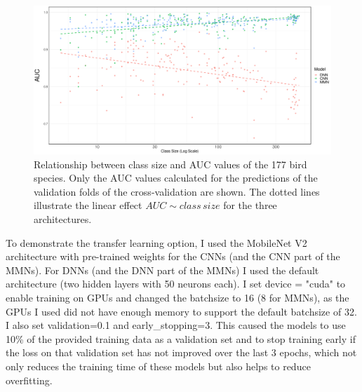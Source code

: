 \documentclass[12pt,twoside]{scrreport}
\begin{document}
\newpage



\begin{figure}[ht]
	\includegraphics[width=\textwidth]{../analysis/results/figures/auc_classSize.pdf}
	\caption{Relationship between class size and AUC values of the 177 bird species. Only the AUC values calculated for the predictions of the validation folds of the cross-validation are shown. The dotted lines illustrate the linear effect $AUC \sim class\,size$ for the three architectures.}
	\label{classSize}
\end{figure}

To demonstrate the transfer learning option, I used the MobileNet V2 \citep{sandlerMobileNetV2InvertedResiduals2019} architecture with pre-trained weights for the CNNs (and the CNN part of the MMNs). For DNNs (and the DNN part of the MMNs) I used the default architecture (two hidden layers with 50 neurons each). I set device = "cuda" to enable training on GPUs and changed the batchsize to 16 (8 for MMNs), as the GPUs I used did not have enough memory to support the default batchsize of 32. I also set validation=0.1 and early\_stopping=3. This caused the models to use 10\% of the provided training data as a validation set and to stop training early if the loss on that validation set has not improved over the last 3 epochs, which not only reduces the training time of these models but also helps to reduce overfitting.
\end{document}
